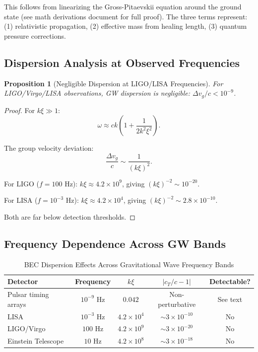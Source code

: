 \documentclass[11pt,a4paper]{article}
\newcommand{\cT}{\ensuremath{c_T}}
\newtheorem{proposition}[theorem]{Proposition}
\theoremstyle{definition}
\theoremstyle{remark}
\begin{document}
This follows from linearizing the Gross-Pitaevskii equation around the ground state (see math derivations document for full proof). The three terms represent: (1) relativistic propagation, (2) effective mass from healing length, (3) quantum pressure corrections.

\subsection{Dispersion Analysis at Observed Frequencies}
\label{sec:dispersion_analysis}

\begin{proposition}[Negligible Dispersion at LIGO/LISA Frequencies]
\label{prop:negligible_dispersion}
For LIGO/Virgo/LISA observations, GW dispersion is negligible: $\Delta v_g/c < 10^{-9}$.
\end{proposition}

\begin{proof}
For $k\xi \gg 1$:
\begin{equation}
\omega \approx ck\left(1 + \frac{1}{2k^2\xi^2}\right).
\end{equation}

The group velocity deviation:
\begin{equation}
\frac{\Delta v_g}{c} \sim \frac{1}{(k\xi)^2}.
\end{equation}

For LIGO ($f = 100$ Hz): $k\xi \approx 4.2 \times 10^{9}$, giving $(k\xi)^{-2} \sim 10^{-20}$.

For LISA ($f = 10^{-3}$ Hz): $k\xi \approx 4.2 \times 10^{4}$, giving $(k\xi)^{-2} \sim 2.8 \times 10^{-10}$.

Both are far below detection thresholds.
\end{proof}

\subsection{Frequency Dependence Across GW Bands}
\label{sec:frequency_bands}

\begin{table}[H]
\centering
\caption{BEC Dispersion Effects Across Gravitational Wave Frequency Bands}
\label{tab:dispersion}
\begin{tabular}{@{}lcccc@{}}
\toprule
\textbf{Detector} & \textbf{Frequency} & \textbf{$k\xi$} & \textbf{$|\cT/c - 1|$} & \textbf{Detectable?} \\
\midrule
Pulsar timing arrays & $10^{-9}$ Hz & $0.042$ & Non-perturbative & See text \\
LISA & $10^{-3}$ Hz & $4.2 \times 10^{4}$ & $\sim 3 \times 10^{-10}$ & No \\
LIGO/Virgo & $100$ Hz & $4.2 \times 10^{9}$ & $\sim 3 \times 10^{-20}$ & No \\
Einstein Telescope & $10$ Hz & $4.2 \times 10^{8}$ & $\sim 3 \times 10^{-18}$ & No \\
\bottomrule
\end{tabular}
\end{table}
\end{document}
